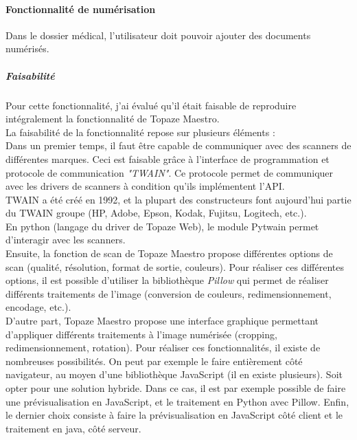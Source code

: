 \paragraph*{Fonctionnalité de numérisation\\}
Dans le dossier médical, l'utilisateur doit pouvoir ajouter des documents numérisés.

\subparagraph*{Faisabilité}
Pour cette fonctionnalité, j'ai évalué qu'il était faisable de reproduire intégralement la fonctionnalité de Topaze Maestro.\\

La faisabilité de la fonctionnalité repose sur plusieurs éléments :\\
Dans un premier temps, il faut être capable de communiquer avec des scanners de différentes marques. Ceci est faisable grâce à l'interface de programmation et protocole de communication \textit{"TWAIN"}. Ce protocole permet de communiquer avec les drivers de  scanners à condition qu'ils implémentent l'API.\\
TWAIN a été créé en 1992\cite{bib:twain}, et la plupart des constructeurs font aujourd'hui partie du TWAIN groupe (HP, Adobe, Epson, Kodak, Fujitsu, Logitech, etc.).\\
En python (langage du driver de Topaze Web), le module Pytwain permet d'interagir avec les scanners.\\

Ensuite, la fonction de scan de Topaze Maestro propose différentes options de scan (qualité, résolution, format de sortie, couleurs). Pour réaliser ces différentes options, il est possible d'utiliser la bibliothèque \textit{Pillow} qui permet de réaliser différents traitements de l'image (conversion de couleurs, redimensionnement, encodage, etc.)\cite{bib:pillow}.\\

D'autre part, Topaze Maestro propose une interface graphique permettant d'appliquer différents traitements à l'image numérisée (cropping, redimensionnement, rotation). 
Pour réaliser ces fonctionnalités, il existe de nombreuses possibilités. On peut par exemple le faire entièrement côté navigateur, au moyen d'une bibliothèque JavaScript (il en existe plusieurs). Soit opter pour une solution hybride. Dans ce cas, il est par exemple possible de faire une prévisualisation en JavaScript, et le traitement en Python avec Pillow. 
Enfin, le dernier choix consiste à faire la prévisualisation en JavaScript côté client et le traitement en java, côté serveur. \\

